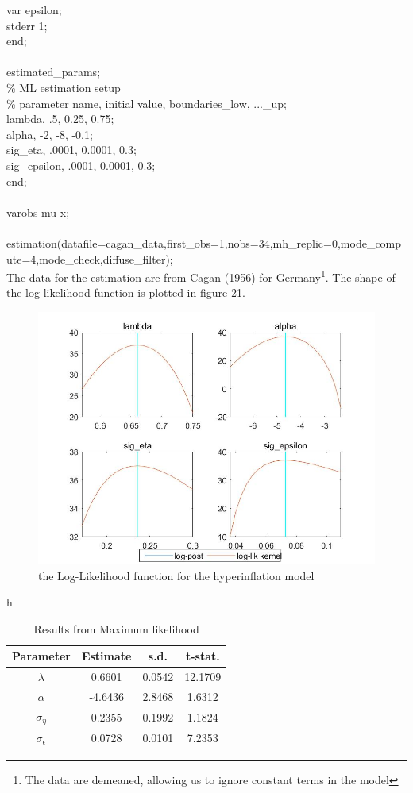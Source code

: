 \documentclass[a4paper,12pt]{scrartcl} %
\begin{document}
{var epsilon;\\
stderr 1;\\
end;\\
\\
estimated\_params;\\
\% ML estimation setup\\
\% parameter name, initial value, boundaries\_low, ...\_up;\\
lambda, .5, 0.25, 0.75;\\
alpha, -2, -8, -0.1;\\
sig\_eta, .0001, 0.0001, 0.3;\\
sig\_epsilon, .0001, 0.0001, 0.3;\\
end;\\
\\
varobs mu x;\\
\\
estimation(datafile=cagan\_data,first\_obs=1,nobs=34,mh\_replic=0,mode\_compute=4,mode\_check,diffuse\_filter);}\\

The data for the estimation are from Cagan (1956) for Germany\footnote{The data are demeaned, allowing us to ignore constant terms in the model}. The shape of the log-likelihood function is plotted in figure 21.

\begin{figure}[htbp!]
		\centering
			\includegraphics[width=0.8\linewidth]{fig21.jpg}
            \caption{the Log-Likelihood function for the hyperinflation model}\label{21}
\end{figure}

\begin{table}{h}
\centering
\caption{Results from Maximum likelihood}\label{6}
\begin{tabular}{cccc}
\hline
Parameter&Estimate&s.d.&t-stat.\\
\hline
$\lambda$&0.6601&0.0542&12.1709\\
$\alpha$&-4.6436&2.8468&1.6312\\
$\sigma_{\eta}$&0.2355&0.1992&1.1824\\
$\sigma_{\epsilon}$&0.0728&0.0101&7.2353\\
\hline
\end{tabular}
\end{table}
\end{document}
